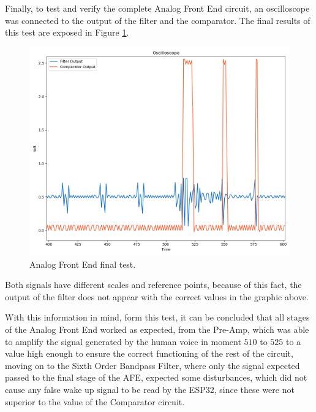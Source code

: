 Finally, to test and verify the complete Analog Front End circuit, an oscilloscope was connected to the output of the filter and the comparator. The final results of this test are exposed in Figure \ref{fig:AFETest}.

\begin{figure}[H]
    \centering
    \includegraphics*[scale = 0.5]{Images/AFEtest.png}
    \caption{Analog Front End final test.}
    \label{fig:AFETest}
\end{figure}

Both signals have different scales and reference points, because of this fact, the output of the filter does not appear with the correct values in the graphic above. 

With this information in mind, form this test, it can be concluded that all stages of the Analog Front End worked as expected, from the Pre-Amp, which was able to amplify the signal generated by the human voice in moment $510$ to $525$ to a value high enough to ensure the correct functioning of the rest of the circuit, moving on to the Sixth Order Bandpass Filter, where only the signal expected passed to the final stage of the AFE, expected some disturbances, which did not cause any false wake up signal to be read by the ESP32, since these were not superior to the value of the Comparator circuit. 
